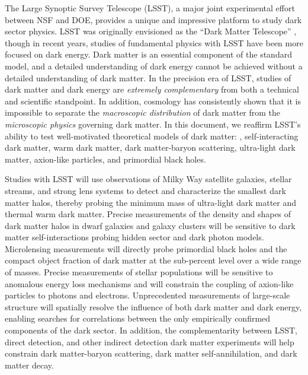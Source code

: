 The Large Synoptic Survey Telescope (LSST), a major joint experimental effort between NSF and DOE, provides a unique and impressive platform to study dark sector physics.
LSST was originally envisioned as the ``Dark Matter Telescope'' \citep{Tyson:2001}, though in recent years, studies of fundamental physics with LSST have been more focused on dark energy.
Dark matter is an essential component of the standard \LCDM model, and a detailed understanding of dark energy cannot be achieved without a detailed understanding of dark matter.
In the precision era of LSST, studies of dark matter and dark energy are \emph{extremely complementary} from both a technical and scientific standpoint.
In addition, cosmology has consistently shown that it is impossible to separate the \emph{macroscopic distribution} of dark matter from the \emph{microscopic physics} governing dark matter.
In this document, we reaffirm LSST's ability to test well-motivated theoretical models of dark matter: \ie, self-interacting dark matter, warm dark matter, dark matter-baryon scattering, ultra-light dark matter, axion-like particles, and primordial black holes. 

Studies with LSST will use observations of Milky Way satellite galaxies, stellar streams, and strong lens systems to detect and characterize the smallest dark matter halos, thereby probing the minimum mass of ultra-light dark matter and thermal warm dark matter.
Precise measurements of the density and shapes of dark matter halos in dwarf galaxies and galaxy clusters will be sensitive to dark matter self-interactions probing hidden sector and dark photon models.
Microlensing measurements will directly probe primordial black holes and the compact object fraction of dark matter at the sub-percent level over a wide range of masses.
Precise measurements of stellar populations will be sensitive to anomalous energy loss mechanisms and will constrain the coupling of axion-like particles to photons and electrons.
Unprecedented measurements of large-scale structure will spatially resolve the influence of both dark matter and dark energy, enabling searches for correlations between the only empirically confirmed components of the dark sector.
In addition, the complementarity between LSST, direct detection, and other indirect detection dark matter experiments will help constrain dark matter-baryon scattering, dark matter self-annihilation, and dark matter decay.

